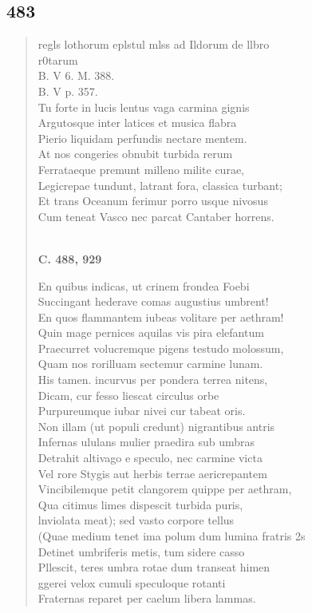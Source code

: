 \documentclass[11pt, a4paper]{report}
\begin{document}
            \subsection*{483}
      \begin{verse}
      regls lothorum eplstul mlss ad Ildorum de llbro \\ r0tarum \\ B. V 6. M. 388. \\ B. V p. 357. \\ Tu forte in lucis lentus vaga carmina gignis \\ Argutosque inter latices et musica flabra \\ Pierio liquidam perfundis nectare mentem. \\ At nos congeries obnubit turbida rerum \\ Ferrataeque premunt milleno milite curae, \\ Legicrepae tundunt, latrant fora, classica turbant; \\ Et trans Oceanum ferimur porro usque nivosus \\ Cum teneat Vasco nec parcat Cantaber horrens. \\ 
        ﻿\pagebreak 
    \begin{center} \textbf{C. 488, 929} \end{center}En quibus indicas, ut crinem frondea Foebi \\ Succingant hederave comas augustius umbrent! \\ En quos flammantem iubeas volitare per aethram! \\ Quin mage pernices aquilas vis pira elefantum \\ Praecurret volucremque pigens testudo molossum, \\ Quam nos rorilluam sectemur carmine lunam. \\ His tamen. incurvus per pondera terrea nitens, \\ Dicam, cur fesso liescat circulus orbe \\ Purpureumque iubar nivei cur tabeat oris. \\ Non illam (ut populi credunt) nigrantibus antris \\ Infernas ululans mulier praedira sub umbras \\ Detrahit altivago e speculo, nec carmine victa \\ Vel rore Stygis aut herbis terrae aericrepantem \\ Vincibilemque petit clangorem quippe per aethram, \\ Qua citimus limes dispescit turbida puris, \\ lnviolata meat); sed vasto corpore tellus \\ (Quae medium tenet ima polum dum lumina fratris 2s \\ Detinet umbriferis metis, tum sidere casso \\ Pllescit, teres umbra rotae dum transeat himen \\ ggerei velox cumuli speculoque rotanti \\ Fraternas reparet per caelum libera lammas. \\ 

\end{verse}
\end{document}
